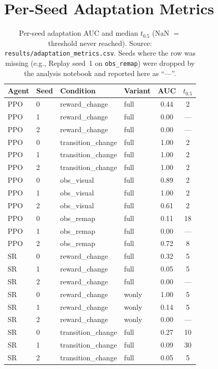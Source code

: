 \section{Per-Seed Adaptation Metrics}
\label{app:per-seed}

\begin{table}[h]
\centering
\small
\caption{Per-seed adaptation AUC and median $t_{0.5}$ (NaN $=$ threshold never reached). Source: \texttt{results/adaptation\_metrics.csv}. Seeds where the row was missing (e.g., Replay seed~1 on \texttt{obs\_remap}) were dropped by the analysis notebook and reported here as ``---''.}
\label{tab:per-seed-auc}
\begin{tabular}{@{}l l l l c c@{}}
\toprule
Agent & Seed & Condition & Variant & AUC & $t_{0.5}$ \\
\midrule
PPO & 0 & reward\_change & full & 0.44 & 2 \\
PPO & 1 & reward\_change & full & 0.00 & --- \\
PPO & 2 & reward\_change & full & 0.00 & --- \\
PPO & 0 & transition\_change & full & 1.00 & 2 \\
PPO & 1 & transition\_change & full & 1.00 & 2 \\
PPO & 2 & transition\_change & full & 1.00 & 2 \\
PPO & 0 & obs\_visual & full & 0.89 & 2 \\
PPO & 1 & obs\_visual & full & 1.00 & 2 \\
PPO & 2 & obs\_visual & full & 0.61 & 2 \\
PPO & 0 & obs\_remap & full & 0.11 & 18 \\
PPO & 1 & obs\_remap & full & 0.00 & --- \\
PPO & 2 & obs\_remap & full & 0.72 & 8 \\
\midrule
SR & 0 & reward\_change & full  & 0.32 & 5 \\
SR & 1 & reward\_change & full  & 0.05 & 5 \\
SR & 2 & reward\_change & full  & 0.00 & --- \\
SR & 0 & reward\_change & wonly & 1.00 & 5 \\
SR & 1 & reward\_change & wonly & 0.14 & 5 \\
SR & 2 & reward\_change & wonly & 0.00 & --- \\
SR & 0 & transition\_change & full & 0.27 & 10 \\
SR & 1 & transition\_change & full & 0.09 & 30 \\
SR & 2 & transition\_change & full & 0.05 & 5 \\

\end{tabular}
\end{table}
